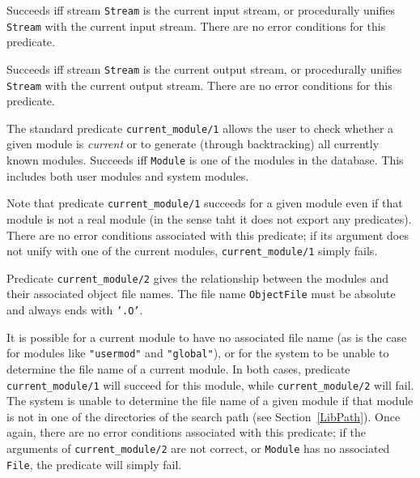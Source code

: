 \begin{description}

    Succeeds iff stream {\tt Stream} is the current input stream, or 
    procedurally unifies {\tt Stream} with the current input stream.
    There are no error conditions for this predicate.

    Succeeds iff stream {\tt Stream} is the current output stream, or 
    procedurally unifies {\tt Stream} with the current output stream.
    There are no error conditions for this predicate.

    The standard predicate {\tt current\_module/1} allows the user to check 
    whether a given module is {\em current} or to generate (through 
    backtracking) all currently known modules.
    Succeeds iff {\tt Module} is one of the modules in the database. This
    includes both user modules and system modules.  

    Note that predicate {\tt current\_module/1} succeeds for a given module 
    even if that module is not a real module (in the sense taht it does not
    export any predicates). There are no error conditions associated 
    with this predicate; if its argument does not unify with one of the 
    current modules, {\tt current\_module/1} simply fails.

    Predicate {\tt current\_module/2} gives the relationship between the
    modules and their associated object file names. The file name 
    {\tt ObjectFile} must be absolute and always ends with {\tt '.O'}.

    It is possible for a current module to have no associated file name 
    (as is the case for modules like {\tt "usermod"} and {\tt "global"}), 
    or for the system to be unable to determine the file name of a current
    module. In both cases, predicate {\tt current\_module/1} will succeed
    for this module, while {\tt current\_module/2} will fail. The system is
    unable to determine the file name of a given module if that module is not
    in one of the directories of the search path (see Section~\ref{LibPath}).
    Once again, there are no error conditions associated with this predicate;
    if the arguments of {\tt current\_module/2} are not correct, or 
    {\tt Module} has no associated {\tt File}, the predicate will simply fail.


\end{description}
